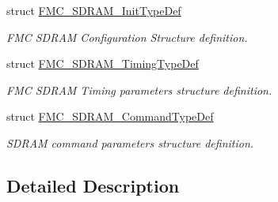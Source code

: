 \begin{DoxyCompactItemize}
struct \hyperlink{struct_f_m_c___s_d_r_a_m___init_type_def}{F\+M\+C\+\_\+\+S\+D\+R\+A\+M\+\_\+\+Init\+Type\+Def}
\begin{DoxyCompactList}\small\item\em F\+MC S\+D\+R\+AM Configuration Structure definition. \end{DoxyCompactList}\item 
struct \hyperlink{struct_f_m_c___s_d_r_a_m___timing_type_def}{F\+M\+C\+\_\+\+S\+D\+R\+A\+M\+\_\+\+Timing\+Type\+Def}
\begin{DoxyCompactList}\small\item\em F\+MC S\+D\+R\+AM Timing parameters structure definition. \end{DoxyCompactList}\item 
struct \hyperlink{struct_f_m_c___s_d_r_a_m___command_type_def}{F\+M\+C\+\_\+\+S\+D\+R\+A\+M\+\_\+\+Command\+Type\+Def}
\begin{DoxyCompactList}\small\item\em S\+D\+R\+AM command parameters structure definition. \end{DoxyCompactList}\end{DoxyCompactItemize}


\subsection{Detailed Description}
